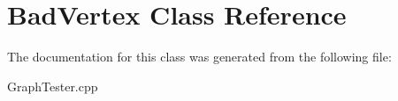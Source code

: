 \hypertarget{a01208}{}\section{Bad\+Vertex Class Reference}
\label{a01208}


The documentation for this class was generated from the following file\+:\begin{DoxyCompactItemize}
\item 
Graph\+Tester.\+cpp\end{DoxyCompactItemize}
